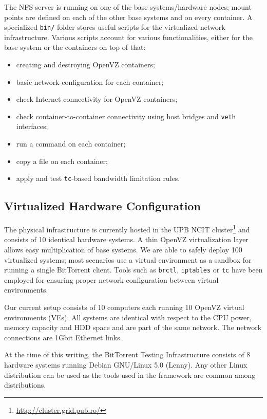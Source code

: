 The NFS server is running on one of the base systems/hardware nodes; mount
points are defined on each of the other base systems and on every container. A
specialized \texttt{bin/} folder stores useful scripts for the virtualized
network infrastructure. Various scripts account for various functionalities,
either for the base system or the containers on top of that:

\begin{itemize}
  \item creating and destroying OpenVZ containers;
  \item basic network configuration for each container;
  \item check Internet connectivity for OpenVZ containers;
  \item check container-to-container connectivity using host bridges and
  \texttt{veth} interfaces;
  \item run a command on each container;
  \item copy a file on each container;
  \item apply and test \texttt{tc}-based bandwidth limitation rules.
\end{itemize}

\subsection{Virtualized Hardware Configuration}

The physical infrastructure is currently hosted in the UPB NCIT
cluster\footnote{\url{http://cluster.grid.pub.ro/}} and
consists of 10 identical hardware systems. A thin OpenVZ virtualization layer
allows easy multiplication of base systems. We are able to safely deploy 100
virtualized systems; most scenarios use a virtual environment as a sandbox for
running a single BitTorrent client. Tools such as \texttt{brctl},
\texttt{iptables} or \texttt{tc} have been employed for ensuring proper
network configuration between virtual environments.

Our current setup consists of 10 computers each running 10 OpenVZ virtual
environments (VEs). All systems are  identical with respect to the CPU power,
memory capacity and HDD space and are part of the same network. The network
connections are 1Gbit Ethernet links.

At the time of this writing, the BitTorrent Testing Infrastructure consists of
8 hardware systems running Debian GNU/Linux 5.0 (Lenny). Any other Linux
distribution can be used as the tools used in the framework are common among
distributions.

